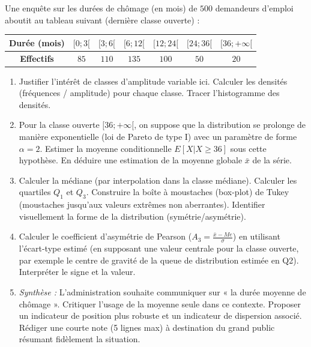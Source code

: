 \documentclass[11pt]{article}
\begin{document}
\begin{exercice}
\label{exo:classes_ouvertes}
Une enquête sur les durées de chômage (en mois) de $500$ demandeurs d'emploi aboutit au tableau suivant (dernière classe ouverte) :

\begin{center}
\begin{tabular}{|c|c|c|c|c|c|c|}
\hline
\textbf{Durée (mois)} & $[0; 3[$ & $[3; 6[$ & $[6; 12[$ & $[12; 24[$ & $[24; 36[$ & $[36 ; +\infty[$ \\
\hline
\textbf{Effectifs} & $85$ & $110$ & $135$ & $100$ & $50$ & $20$ \\
\hline
\end{tabular}
\end{center}

\begin{enumerate}
    \item Justifier l'intérêt de classes d'amplitude variable ici. Calculer les densités (fréquences / amplitude) pour chaque classe. Tracer l'histogramme des densités.
    \item Pour la classe ouverte $[36 ; +\infty[$, on suppose que la distribution se prolonge de manière exponentielle (loi de Pareto de type I) avec un paramètre de forme $\alpha = 2$. Estimer la moyenne conditionnelle $E[X | X \ge 36]$ sous cette hypothèse. En déduire une estimation de la moyenne globale $\bar{x}$ de la série.
    \item Calculer la médiane (par interpolation dans la classe médiane). Calculer les quartiles $Q_1$ et $Q_3$. Construire la boîte à moustaches (box-plot) de Tukey (moustaches jusqu'aux valeurs extrêmes non aberrantes). Identifier visuellement la forme de la distribution (symétrie/asymétrie).
    \item Calculer le coefficient d'asymétrie de Pearson ($A_3 = \frac{\bar{x} - Me}{\sigma}$) en utilisant l'écart-type estimé (en supposant une valeur centrale pour la classe ouverte, par exemple le centre de gravité de la queue de distribution estimée en Q2). Interpréter le signe et la valeur.
    \item \textit{Synthèse :} L'administration souhaite communiquer sur « la durée moyenne de chômage ». Critiquer l'usage de la moyenne seule dans ce contexte. Proposer un indicateur de position plus robuste et un indicateur de dispersion associé. Rédiger une courte note (5 lignes max) à destination du grand public résumant fidèlement la situation.
\end{enumerate}
\end{exercice}
\end{document}

